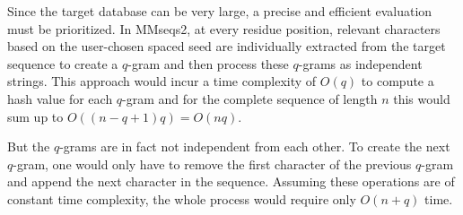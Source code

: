 Since the target database can be very large, a precise and efficient evaluation must be prioritized. In MMseqs2, at every residue position, relevant characters based on the user-chosen spaced seed are individually extracted from the target sequence to create a \(q\)-gram and then process these \(q\)-grams  as independent strings. This approach would incur a time complexity of \(O(q)\) to compute a hash value for each \(q\)-gram and for the complete sequence of length \(n\) this would sum up to $O((n-q+1)q)=O(nq)$.

But the \(q\)-grams are in fact not independent from each other. To create the next \(q\)-gram, one would only have to remove the first character of the previous \(q\)-gram and append the next character in the sequence. Assuming these operations are of constant time complexity, the whole process would require only $O(n+q)$ time.

